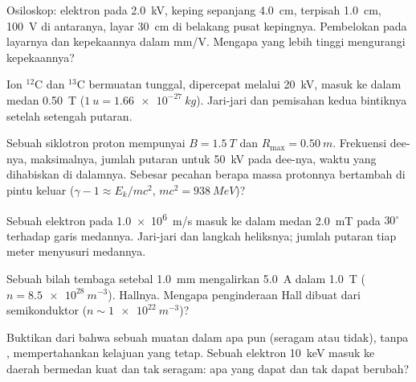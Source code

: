 \begin{exercise}[$\star\star$]\label{exo:b1:charged-particles:5}
Osiloskop: elektron pada \qty{2.0}{kV}, keping sepanjang \qty{4.0}{cm},
terpisah \qty{1.0}{cm}, \qty{100}{V} di antaranya, layar \qty{30}{cm} di belakang
pusat kepingnya. Pembelokan pada layarnya dan kepekaannya dalam mm/V.
Mengapa  yang lebih tinggi mengurangi kepekaannya?
\end{exercise}

\begin{exercise}[$\star\star$]\label{exo:b1:charged-particles:6}
Ion $^{12}$C dan $^{13}$C bermuatan tunggal, dipercepat melalui
\qty{20}{kV}, masuk ke dalam medan \qty{0.50}{T} ($\qty{1}{u} = \qty{1.66e-27}{kg}$).
Jari-jari dan pemisahan kedua bintiknya setelah setengah putaran.
\end{exercise}

\begin{exercise}[$\star\star$]\label{exo:b1:charged-particles:7}
Sebuah siklotron proton mempunyai $B = \qty{1.5}{T}$ dan $R_{\max} = \qty{0.50}{m}$.
Frekuensi  dee-nya,  maksimalnya, jumlah putaran
untuk \qty{50}{kV} pada dee-nya, waktu yang dihabiskan di dalamnya. Sebesar
pecahan berapa massa protonnya bertambah di pintu keluar ($\gamma - 1 \approx E_k/mc^2$,
$mc^2 = \qty{938}{MeV}$)?
\end{exercise}

\begin{exercise}[$\star\star$]\label{exo:b1:charged-particles:8}
Sebuah elektron pada \qty{1.0e6}{m/s} masuk ke dalam medan \qty{2.0}{mT} pada $30^\circ$
terhadap garis medannya. Jari-jari dan langkah heliksnya; jumlah putaran
tiap meter menyusuri medannya.
\end{exercise}

\begin{exercise}[$\star\star$]\label{exo:b1:charged-particles:9}
Sebuah bilah tembaga setebal \qty{1.0}{mm} mengalirkan \qty{5.0}{A} dalam \qty{1.0}{T}
($n = \qty{8.5e28}{m^{-3}}$).  Hallnya. Mengapa penginderaan Hall dibuat dari
semikonduktor ($n \sim \qty{1e22}{m^{-3}}$)?
\end{exercise}

\begin{exercise}[$\star\star\star$]\label{exo:b1:charged-particles:10}
Buktikan dari  bahwa sebuah muatan dalam  apa pun
(seragam atau tidak), tanpa , mempertahankan kelajuan yang tetap.
Sebuah elektron \qty{10}{keV} masuk ke daerah bermedan kuat dan tak seragam:
apa yang dapat dan tak dapat berubah?
\end{exercise}

